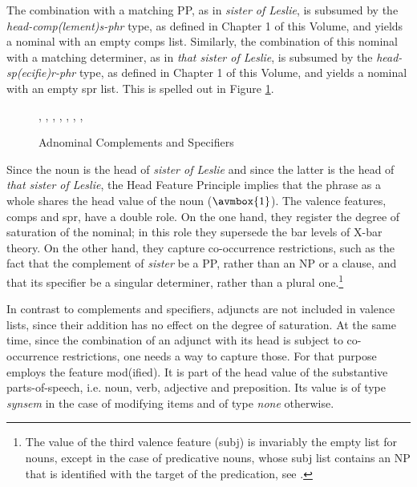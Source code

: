 \documentclass[output=paper]{langsci/langscibook}
\begin{document}
\noindent
The combination with a matching PP, as in {\it sister of Leslie},   
is subsumed by the {\it head-comp(lement)s-phr\/} type, as defined in 
Chapter 1 of this Volume, 
and yields a nominal with an empty {\sc comps} list.  
Similarly, the combination of this nominal with a matching determiner, as in {\it that sister of Leslie},    
is subsumed by the {\it head-sp(ecifie)r-phr\/} type, as defined in Chapter 1 of this Volume, 
and yields a nominal with an empty {\sc spr} list. This is spelled out in Figure \ref{les}. 

\begin{figure}
\begin{center}
\footnotesize
\tree
{,
  {,
    {}},
  {,
    {,
      {}},
    {, 
      {}}}}
\caption{\label{les} Adnominal Complements and Specifiers  }
\normalsize
\end{center}
\end{figure}

Since the noun is the head of {\it sister of Leslie\/} and since the latter is 
the head of {\it that sister of Leslie}, the Head Feature Principle implies 
that the phrase as a whole shares the {\sc head} value of the noun ($\avmbox{1}$). 
The valence features, {\sc comps} and {\sc spr}, have a double role. 
On the one hand, they register the degree of saturation of the nominal; 
in this role they supersede the bar levels of X-bar theory. 
On the other hand, they capture co-occurrence restrictions, 
such as the fact that the complement of {\it sister\/} be a PP, rather than an NP or a clause, 
and that its specifier be a singular determiner, rather than a plural one.\footnote{The 
value of the third valence feature ({\sc subj}) is invariably the empty list for nouns, 
except in the case of predicative nouns, whose {\sc subj} list contains an NP 
that is identified with the target of the predication, see \citet[409]{GS00}.}

In contrast to complements and specifiers, adjuncts are not included in valence lists, 
since their addition has no effect on the degree of saturation. At the same time, 
since the combination of an adjunct with its head is subject to 
co-occurrence restrictions, one needs a way to capture those. 
For that purpose \citet[55--57]{PS94} employs the feature {\sc mod(ified)}. 
It is part of the {\sc head} value of the substantive parts-of-speech, 
i.e. noun, verb, adjective and preposition. Its value is of type {\it synsem\/} 
in the case of modifying items and of type {\it none\/} otherwise.
\end{document}
